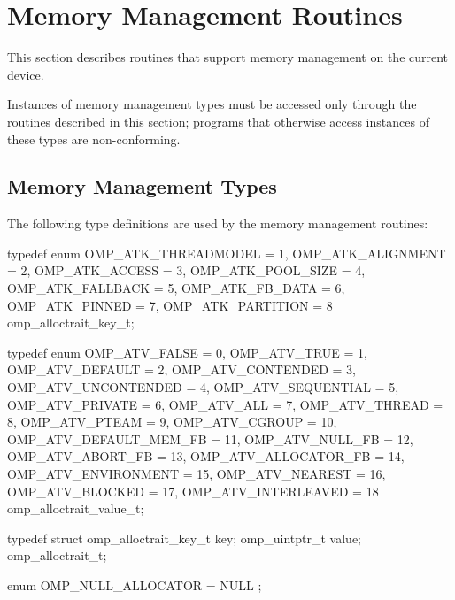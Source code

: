 
\section{Memory Management Routines}
\label{sec:Memory Management Routines}
This section describes routines that support memory management on the current device.

Instances of memory management types must be accessed only through the routines described in this section; programs that otherwise access instances of these types are non-conforming.

\subsection{Memory Management Types}
\label{subsec:Memory Management Types}

The following type definitions are used by the memory management routines:

\begin{ccppspecific}
\begin{ompEnv}
typedef enum {
  OMP_ATK_THREADMODEL = 1,
  OMP_ATK_ALIGNMENT = 2,
  OMP_ATK_ACCESS = 3,
  OMP_ATK_POOL_SIZE = 4,
  OMP_ATK_FALLBACK = 5,
  OMP_ATK_FB_DATA = 6,
  OMP_ATK_PINNED = 7,
  OMP_ATK_PARTITION = 8
} omp_alloctrait_key_t;

typedef enum {
  OMP_ATV_FALSE = 0,   
  OMP_ATV_TRUE = 1,    
  OMP_ATV_DEFAULT = 2,
  OMP_ATV_CONTENDED = 3,
  OMP_ATV_UNCONTENDED = 4,
  OMP_ATV_SEQUENTIAL = 5,
  OMP_ATV_PRIVATE = 6,
  OMP_ATV_ALL = 7,
  OMP_ATV_THREAD = 8,
  OMP_ATV_PTEAM = 9,
  OMP_ATV_CGROUP = 10,
  OMP_ATV_DEFAULT_MEM_FB = 11,
  OMP_ATV_NULL_FB = 12,
  OMP_ATV_ABORT_FB = 13,
  OMP_ATV_ALLOCATOR_FB = 14,
  OMP_ATV_ENVIRONMENT = 15,
  OMP_ATV_NEAREST = 16,
  OMP_ATV_BLOCKED = 17,
  OMP_ATV_INTERLEAVED = 18
} omp_alloctrait_value_t;

typedef struct {
  omp_alloctrait_key_t key;
  omp_uintptr_t value;
} omp_alloctrait_t;

enum { OMP_NULL_ALLOCATOR = NULL };
\end{ompEnv}
\end{ccppspecific}

